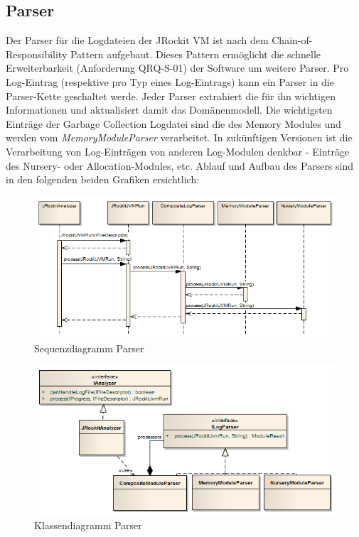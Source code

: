 \subsection{Parser}
Der Parser für die Logdateien der JRockit VM ist nach dem Chain-of-Responsibility Pattern\cite{wiki:chainOfResponsibilityPattern} aufgebaut. Dieses Pattern ermöglicht die schnelle Erweiterbarkeit (Anforderung QRQ-S-01) der Software um weitere Parser. Pro Log-Eintrag (respektive pro Typ eines Log-Eintrags) kann ein Parser in die Parser-Kette geschaltet werde. Jeder Parser extrahiert die für ihn wichtigen Informationen und aktualisiert damit das Domänenmodell. Die wichtigsten Einträge der Garbage Collection Logdatei sind die des Memory Modules und werden vom \textit{MemoryModuleParser} verarbeitet. In zukünftigen Versionen ist die Verarbeitung von Log-Einträgen von anderen Log-Modulen denkbar - Einträge des Nursery- oder Allocation-Modules, etc. Ablauf und Aufbau des Parsers sind in den folgenden beiden Grafiken ersichtlich:

 \begin{figure}[H]
  	\centering
    	\includegraphics[width=16cm]{images/acitivity_parse_prozess}
        	\caption{Sequenzdiagramm Parser}
\end{figure}
 \begin{figure}[H]
  	\centering
    	\includegraphics[width=16cm]{images/jrockit_log_processing}
        	\caption{Klassendiagramm Parser}
\end{figure}

